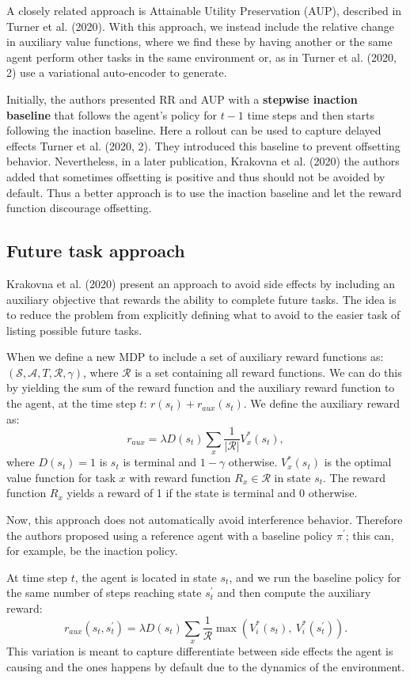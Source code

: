 \documentclass[12pt,A4]{report}
\theoremstyle{definition}
\begin{document}
A closely related approach is Attainable Utility Preservation (AUP), described in Turner et al. (2020). With this approach, we instead include the relative change in auxiliary value functions, where we find these by having another or the same agent perform other tasks in the same environment or, as in Turner et al. (2020, 2) use a variational auto-encoder to generate.

Initially, the authors presented RR and AUP with a \textbf{stepwise inaction baseline} that follows the agent's policy for $t-1$ time steps and then starts following the inaction baseline. Here a rollout can be used to capture delayed effects Turner et al. (2020, 2). They introduced this baseline to prevent offsetting behavior. Nevertheless, in a later publication, Krakovna et al. (2020) the authors added that sometimes offsetting is positive and thus should not be avoided by default. Thus a better approach is to use the inaction baseline and let the reward function discourage offsetting. 

\subsection{Future task approach}
Krakovna et al. (2020) present an approach to avoid side effects by including an auxiliary objective that rewards the ability to complete future tasks. The idea is to reduce the problem from explicitly defining what to avoid to the easier task of listing possible future tasks. 

When we define a new MDP to include a set of auxiliary reward functions as: $(\mathcal{S}, \mathcal{A}, T, \mathcal{R}, \gamma)$, where $\mathcal{R}$ is a set containing all reward functions. We can do this by yielding the sum of the reward function and the auxiliary reward function to the agent, at the time step $t$: $r(s_t) + r_{aux}(s_t)$. We define the auxiliary reward as:
\[ r_{aux} = \lambda D(s_t) \sum_x \frac{1}{|\mathcal{R}|} V_x^*(s_t),\]
where $D(s_t) = 1$ is $s_t$ is terminal and $1-\gamma$ otherwise. $V_x^{*}(s_t)$ is the optimal value function for task $x$ with reward function $R_x \in \mathcal{R}$ in state $s_t$. The reward function $R_x$ yields a reward of 1 if the state is terminal and 0 otherwise. 

Now, this approach does not automatically avoid interference behavior. Therefore the authors proposed using a reference agent with a baseline policy $\pi^\prime$; this can, for example, be the inaction policy. 

At time step $t$, the agent is located in state $s_t$, and we run the baseline policy for the same number of steps reaching state $s^\prime_t$ and then compute the auxiliary reward:
\[r_{aux} (s_t, s_t^\prime) = \lambda D(s_t) \sum_x \frac{1}{\mathcal{R}} \max(V_i^*(s_t), \ V_i^*(s_t^\prime)). \]
This variation is meant to capture differentiate between side effects the agent is causing and the ones happens by default due to the dynamics of the environment. 
\end{document}
